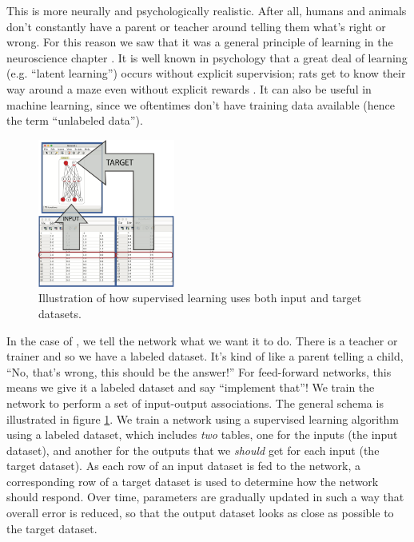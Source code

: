 This is more neurally and psychologically realistic. After all, humans and animals don't constantly have a parent or teacher around telling them what's right or wrong.  For this reason we saw that it was a general principle of learning in the neuroscience chapter . It is well known in psychology that a great deal of learning (e.g. ``latent learning'') occurs without explicit supervision; rats get to know their way around a maze even without explicit rewards \cite{wang2021latent}. It can also be useful in  machine learning, since we oftentimes don't have training data available (hence the term ``unlabeled data''). 

\begin{figure}[h]
\centering
\includegraphics[width=0.4\textwidth]{./images/dataset_supervised.png}
\caption[Simbrain screenshot with graphical elements added by Pamela Payne.]{Illustration of how supervised learning uses both input and target datasets.}
\label{supervised_learning}
\end{figure}

In the case of , we tell the network what we want it to do. There is a teacher or trainer and so we have a labeled dataset. It's kind of like a parent telling a child, ``No, that's wrong, this should be the answer!'' For feed-forward networks, this means we give it a labeled dataset and say ``implement that''! We train the network to perform a set of input-output associations. The general schema is illustrated in figure \ref{supervised_learning}. We train a network using a supervised learning algorithm using a labeled dataset, which includes \emph{two} tables, one for the inputs (the input dataset), and another for the outputs that we \emph{should} get for each input (the target dataset). As each row of an input dataset is  fed to the network, a corresponding row of a target dataset is used to determine how the network should respond. Over time, parameters are gradually updated in such a way that overall error is reduced, so that the output dataset looks as close as possible to the target dataset.

